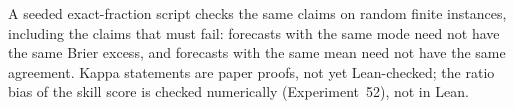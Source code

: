 A seeded exact-fraction script checks the same claims on random finite instances, including the claims that must fail: forecasts with the same mode need not have the same Brier excess, and forecasts with the same mean need not have the same agreement.
Kappa statements are paper proofs, not yet Lean-checked; the ratio bias of the skill score is checked numerically (Experiment~52), not in Lean.
